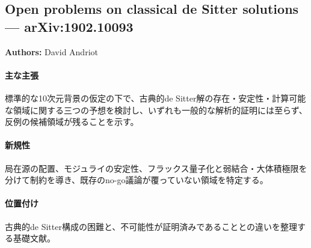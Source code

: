 \subsection{Open problems on classical de Sitter solutions --- arXiv:1902.10093}

\textbf{Authors:} David Andriot

\paragraph{主な主張}
標準的な10次元背景の仮定の下で、古典的de Sitter解の存在・安定性・計算可能な領域に関する三つの予想を検討し、いずれも一般的な解析的証明には至らず、反例の候補領域が残ることを示す\cite{Andriot:2019wrs}。

\paragraph{新規性}
局在源の配置、モジュライの安定性、フラックス量子化と弱結合・大体積極限を分けて制約を導き、既存のno-go議論が覆っていない領域を特定する。

\paragraph{位置付け}
古典的de Sitter構成の困難と、不可能性が証明済みであることとの違いを整理する基礎文献。
